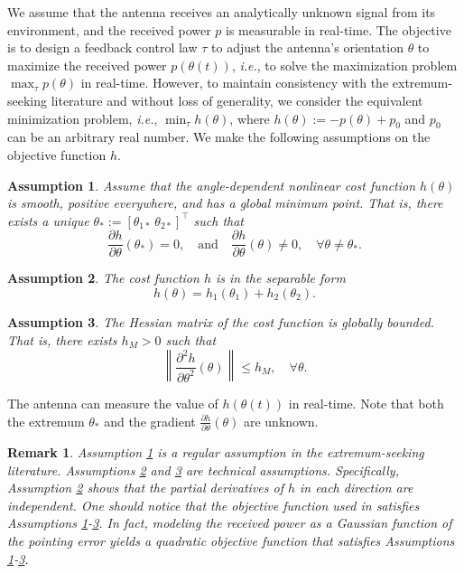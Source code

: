 \documentclass{ifacconf}
\newtheorem{assumption}{Assumption}
\newtheorem{remark}{Remark}
\begin{document}
We assume that the antenna receives an analytically unknown signal from its environment, and the received power $p$ is measurable in real-time. The objective is to design a feedback control law $\tau$ to adjust the antenna's orientation $\theta$ to maximize the received power $p(\theta(t))$, \textit{i.e.}, to solve the maximization problem $\max_{\tau}p(\theta)$ in real-time. However, to maintain consistency with the extremum-seeking literature and without loss of generality, we consider the equivalent minimization problem, \textit{i.e.}, $\min_{\tau}h(\theta)$, where $h(\theta):=-p(\theta)+p_0$ and $p_0$ can be an arbitrary real number. We make the following assumptions on the objective function $h$.
\begin{assumption}\label{assumption:0}
    Assume that the angle-dependent nonlinear cost function $h(\theta)$ is smooth, positive everywhere, and has a global minimum point. That is, there exists a unique $\theta_*:=[\theta_{1*}~\theta_{2*}]^\top$ such that
    \begin{equation}
        \frac{\partial h}{\partial \theta}(\theta_*)=0,\quad\text{and}\quad\frac{\partial h}{\partial \theta}(\theta)\ne 0,\quad \forall\theta\ne \theta_*.
    \end{equation}
\end{assumption}
\begin{assumption}\label{assumption:1}
    The cost function $h$ is in the separable form
    \begin{equation}
        h(\theta)=h_1(\theta_1)+h_2(\theta_2).
    \end{equation}
\end{assumption}
\begin{assumption}\label{assumption:2}
    The Hessian matrix of the cost function is globally bounded. That is, there exists $h_M>0$ such that 
    \begin{equation}
        \left \| \frac{\partial^2 h}{\partial \theta^2} (\theta)\right\|\le h_M,\quad \forall \theta.
    \end{equation}
\end{assumption}

The antenna can measure the value of $h(\theta(t))$ in real-time. Note that both the
extremum $\theta_*$ and the gradient $\frac{\partial h}{\partial \theta}(\theta)$ are unknown.

\begin{remark}\label{rmk:1}
    Assumption \ref{assumption:0} is a regular assumption in the extremum-seeking literature. Assumptions \ref{assumption:1} and \ref{assumption:2} are technical assumptions. Specifically, Assumption \ref{assumption:1} shows that the partial derivatives of $h$ in each direction are independent. One should notice that the objective function used in \cite{shore2024extremum} satisfies Assumptions \ref{assumption:0}-\ref{assumption:2}. In fact, modeling the received power as a Gaussian function of the pointing error yields a quadratic objective function that satisfies Assumptions \ref{assumption:0}-\ref{assumption:2}.
\end{remark}
\end{document}
